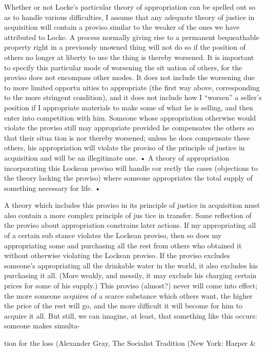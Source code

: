 \documentclass[11pt,openany]{book}
\begin{document}
Whether or not Locke's particular theory of appropriation can be spelled out so as to handle various difficulties, I assume that any adequate theory of justice in acquisition will contain a proviso similar to the weaker of the ones we have attributed to Locke. A process normally giving rise to a permanent bequeathable property right in a previously unowned thing will not do so if the position of others no longer at liberty to use the thing is thereby worsened. It is important to specify this particular mode of worsening the sit uation of others, for the proviso does not encompass other modes. It does not include the worsening due to more limited opportu nities to appropriate (the first way above, corresponding to the more stringent condition), and it does not include how I ``worsen'' a seller's position if I appropriate materials to make some of what he is selling, and then enter into competition with him. Someone whose appropriation otherwise would violate the proviso still may appropriate provided he compensates the others so that their situa tion is nor thereby worsened; unless he does compensate these others, his appropriation will violate the proviso of the principle of justice in acquisition and will be an illegitimate one. • A theory of appropriation incorporating this Lockean proviso will handle cor rectly the cases (objections to the theory lacking the proviso) where someone appropriates the total supply of something necessary for life. • 

A theory which includes this proviso in its principle of justice in acquisition must also contain a more complex principle of jus tice in transfer. Some reflection of the proviso about appropriation constrains later actions. If my appropriating all of a certain sub stance violates the Lockean proviso, then so does my appropriating some and purchasing all the rest from others who obtained it without otherwise violating the Lockean proviso. If the proviso excludes someone's appropriating all the drinkable water in the world, it also excludes his purchasing it all. (More weakly, and messily, it may exclude his charging certain prices for some of his supply.) This proviso (almost?) never will come into effect; the more someone acquires of a scarce substance which others want, the higher the price of the rest will go, and the more difficult it will become for him to acquire it all. But still, we can imagine, at least, that something like this occurs: someone makes simulta-

tion for the loss (Alexander Gray, The Socialist Tradition (New York: Harper \& 
\end{document}
